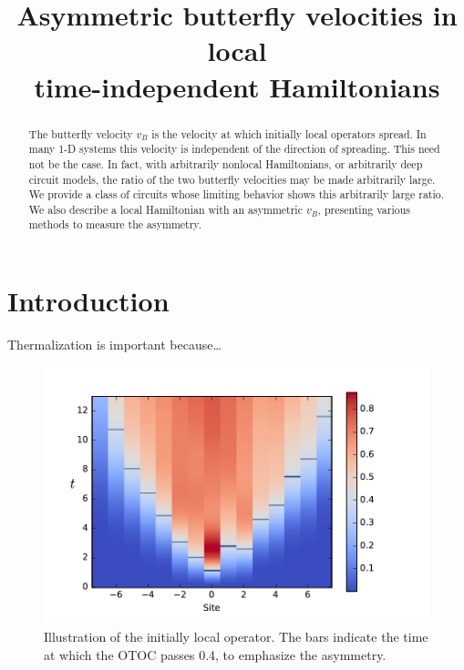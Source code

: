 \documentclass[aps,prx,reprint,superscriptaddress, longbibliography]{revtex4-1}
\begin{document}
\title{Asymmetric butterfly velocities in local\\ time-independent Hamiltonians
} 
%

\begin{abstract}
The butterfly velocity $v_B$ is the velocity at which initially local operators spread. In many 1-D systems this velocity is independent of the direction of spreading. This need not be the case. In fact, with arbitrarily nonlocal Hamiltonians, or arbitrarily deep circuit models, the ratio of the two butterfly velocities may be made arbitrarily large. We provide a class of circuits whose limiting behavior shows this arbitrarily large ratio. We also describe a local Hamiltonian with an asymmetric $v_B$, presenting various methods to measure the asymmetry.
\end{abstract}

\maketitle

\section{Introduction}

Thermalization is important because\dots

\begin{figure}
	\includegraphics[width=\columnwidth]{colorplot}
	\caption{Illustration of the initially local operator. The bars indicate the time at which the OTOC passes 0.4, to emphasize the asymmetry.}
	\label{fig:colorplot}
\end{figure}
\end{document}
